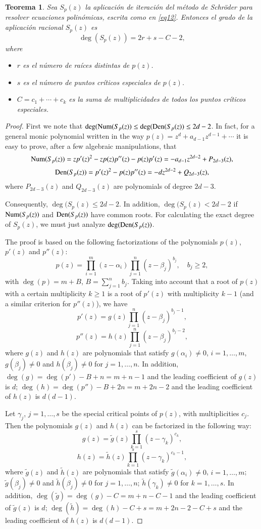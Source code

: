 \IfFileExists{aims.cls}{\documentclass{aims}}{\documentclass[11pt]{article}}
\numberwithin{equation}{section}
\theoremstyle{thmstyleone}%
\newtheorem{theorem}{Teorema}%
\theoremstyle{thmstyletwo}%
\theoremstyle{thmstylethree}%
\newcommand{\Den}{\mathop{\rm Den}}
\newcommand{\Num}{\mathop{\rm Num}}
\begin{document}
\begin{theorem}\label{Teo1}
Sea $S_p(z)$ la aplicación de iteración del método de Schr\"oder para resolver ecuaciones polinómicas, escrita como en  \eqref{eq12}. Entonces el grado de la aplicación racional $S_{p}(z)$ es
$$\deg(S_{p}(z)) =2r+s-C-2,$$
where
\begin{itemize}
\item $ r $ es el número de raíces distintas de $p(z)$.
\item $s$  es el número de puntos críticos especiales de $p(z)$.
\item $C=c_1+\cdots+c_k$  es la suma de multiplicidades de todos los puntos críticos especiales. 
\end{itemize}
\end{theorem}

\begin{proof} First we note that  $\deg(\Num(S_p(z))\le \deg(\Den(S_p(z))\le 2d-2$. In fact, for a general monic polynomial written in the way $p(z)=z^d +a_{d-1} z^{d-1} + \cdots$ it is easy to prove, after a few algebraic manipulations, that
$$ \Num(S_p(z))=zp'(z)^2-zp(z)p''(z)-p(z)p'(z)=-a_{d-1}z^{2d-2}+P_{2d-3}(z), $$
$$ \Den(S_p(z))=p'(z)^2-p(z)p''(z)=-dz^{2d-2}+Q_{2d-3}(z),$$
where $P_{2d-3}(z)$ and $Q_{2d-3}(z)$ are  polynomials of degree $2d-3$. 

Consequently, $\deg(S_p(z)\le 2d-2$. In addition,  $\deg(S_p(z)< 2d-2$ if $\Num(S_p(z))$ and $\Den(S_p(z))$ have common roots. For calculating the exact degree of $S_p(z)$,  we must just   analyze $\deg(\Den(S_p(z))$.

The proof is based on the following factorizations of the polynomials $p(z)$, $p'(z)$ and $p''(z)$:
\[
p(z)=\prod_{i=1}^m(z-\alpha_i)\prod_{j=1}^n(z-\beta_j)^{b_j},\quad b_j\ge 2,
\]
with $\deg(p)=m+B$, $B=\sum_{j=1}^n b_j.$ Taking into account that a root of $p(z)$ with a certain multiplicity $k\ge 1$ is a root of $p'(z)$ with multiplicity $k-1$ (and a similar criterion for $p''(z)$), we have
$$p'(z)=g(z)\prod_{j=1}^n(z-\beta_j)^{b_j-1},$$
$$p''(z)=h(z)\prod_{j=1}^n(z-\beta_j)^{b_j-2},$$
where $g(z)$ and $h(z)$ are polynomials that satisfy $g(\alpha_i)\ne 0$, $i=1,\dots, m$, $g(\beta_j)\ne0$ and $h(\beta_j)\ne 0$ for $j=1,\dots, n$. 
In addition, $\deg(g)=\deg(p')-B+n=m+n-1$ and the leading coefficient of $g(z)$ is $d$; $\deg(h)=\deg(p'')-B+2n=m+2n-2$ and the leading coefficient of $h(z)$ is $d(d-1)$.

 Let $\gamma_j$, $j=1,\dots, s$ be the special critical points of $p(z)$, with multiplicities $c_j$. Then the polynomials $g(z)$ and $h(z)$ can be factorized in the following way:
$$g(z)=\tilde{g}(z)\prod_{k=1}^s(z-\gamma_k)^{c_k},$$
$$h(z)=\tilde{h}(z)\prod_{k=1}^s(z-\gamma_k)^{c_k-1},$$
where $\tilde{g}(z)$ and $\tilde{h}(z)$ are polynomials that satisfy $\tilde{g}(\alpha_i)\ne 0$, $i=1,\dots, m$; $\tilde{g}(\beta_j)\ne0$ and $\tilde{h}(\beta_j)\ne 0$ for $j=1,\dots, n$; $\tilde{h}(\gamma_k)\ne 0$ for $k=1,\dots, s$.
In addition, $\deg(\tilde{g})=\deg(g)-C=m+n-C-1$ and the leading coefficient of $\tilde{g}(z)$ is $d$; $\deg(\tilde{h})=\deg(h)-C+s=m+2n-2-C+s$ and the leading coefficient of $h(z)$ is $d(d-1)$.



\end{proof}
\end{document}
